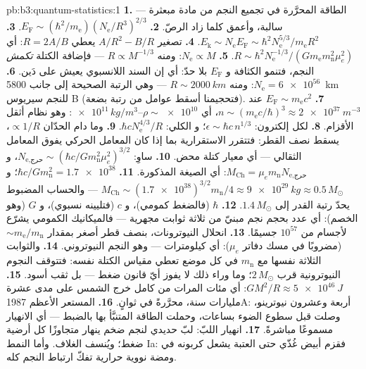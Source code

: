 \begin{solution}{pb:b3:quantum-statistics:1}
\textbf{1.} الطاقة المحرَّرة في تجميع النجم من مادة
مبعثرة --- سالبة، وأعمق كلما زاد الرصّ.
\textbf{2.} $E_{\text{F}} \sim (\hbar^2/m_{\text{e}})
(N_{\text{e}}/R^3)^{2/3}$.
\textbf{3.} $E_{\text{k}} \sim N_{\text{e}}E_{\text{F}} \sim
\hbar^2N_{\text{e}}^{5/3}/m_{\text{e}}R^2$.
\textbf{4.} تصغير $A/R^2 - B/R$ يعطي $R = 2A/B$: أي $R \sim
\hbar^2N_{\text{e}}^{-1/3}/(Gm_{\text{e}}m_{\text{n}}^2\mu_e^2)$.
\textbf{5.} $N_{\text{e}} \propto M$: ومنه $R \propto M^{-1/3}$ ---
فإضافة الكتلة \emph{تكمش} النجم، فتنمو الكثافة و $E_{\text{F}}$
بلا حدّ: أي إن السند اللانسبوي يعيش على
دَين.
\textbf{6.} $N_{\text{e}} = \num{6e56}$: ومنه $R \sim \qty{2000}{km}$
--- وهي الرتبة الصحيحة إلى جانب \qty{5800}{km} للنجم سيريوس B (فتحجيمنا
أسقط عوامل من رتبة بضعة).
\textbf{7.} $E_{\text{F}} \sim m_{\text{e}}c^2$ عند $n \sim
(m_{\text{e}}c/\hbar)^3 \approx \qty{2e37}{m^{-3}}$، أي $\rho
\sim \num{e10}$--$\num{e11}\,\unit{kg/m^3}$: وهو نظام
أثقل الأقزام.
\textbf{8.} لكل إلكترون: $\epsilon \sim \hbar c\,n^{1/3}$؛ و
الكلي: $\hbar cN_{\text{e}}^{4/3}/R$.
\textbf{9.} وما دام الحدّان $\propto 1/R$، يسقط نصف القطر:
فتتقرر الاستقرارية بما إذا كان المعامل الحركي يفوق
المعامل الثقالي --- أي معيار كتلة محض.
\textbf{10.} ساوِ: $N_{\text{e,حرج}} \sim (\hbar c/
Gm_{\text{n}}^2\mu_e^2)^{3/2}$، و $M_{\text{Ch}} =
\mu_em_{\text{n}}N_{\text{e,حرج}}$: أي الصيغة المذكورة.
\textbf{11.} $\hbar c/Gm_{\text{n}}^2 = \num{1.7e38}$؛ و
$M_{\text{Ch}} \sim (\num{1.7e38})^{3/2}m_{\text{n}}/4 \approx
\qty{9e29}{kg} \approx 0.5\,M_\odot$ --- والحساب المضبوط
يحدّ رتبة القدر إلى $1.4\,M_\odot$.
\textbf{12.} $\hbar$ (فالضغط كمومي)، و $c$ (فتليينه
نسبوي)، و $G$ (وهو الخصم): أي عدد بحجم نجم
مبنيّ من ثلاثة ثوابت مجهرية --- فالميكانيك الكمومي
يشرّع لأجسام من $10^{57}$ جسيمًا.
\textbf{13.} انحلال النيوترونات، بنصف قطر أصغر بمقدار
$\sim m_{\text{e}}/m_{\text{n}}$ (مضروبًا في مسك دفاتر $\mu_e$):
أي كيلومترات --- وهو النجم النيوتروني.
\textbf{14.} والثوابت الثلاثة نفسها مع $m_{\text{n}}$
في كل موضع تعطي مقياس الكتلة نفسه: فتتوقف النجوم النيوترونية قرب
$2\,M_\odot$؛ وما وراء ذلك لا يفوز أيّ قانون ضغط --- بل ثقب أسود.
\textbf{15.} $GM^2/R \approx \qty{5e46}{J}$: أي مئات المرات
من كامل خرج الشمس على مدى عشرة مليارات سنة، محرَّرةً في ثوانٍ.
\textbf{16.} المستعر الأعظم 1987A: أربعة وعشرون نيوترينو، وصلت قبل
سطوع الضوء بساعات، وحملت الطاقة المتنبَّأ بها بالضبط
--- أي الانهيار مسموعًا مباشرةً.
\textbf{17.} انهيار اللبّ: لبّ حديدي لنجم ضخم ينهار
متجاوزًا كل أرضية ضغط؛ ويُنسف الغلاف. وأما النمط Ia: فقزم
أبيض غُذّي حتى العتبة يشعل كربونه في
ومضة نووية حرارية تفكّ ارتباط النجم كله.

\end{solution}

